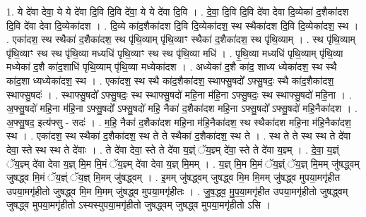 \documentclass[17pt]{extarticle}
\begin{document}
1. ये दे॑वा देवा॒ ये ये दे॑वा दि॒वि दि॒वि दे॑वा॒ ये ये दे॑वा दि॒वि । . दे॒वा॒ दि॒वि दि॒वि दे॑वा देवा दि॒व्येका॑ द॒शैका॑दश दि॒वि दे॑वा देवा दि॒व्येका॑दश । . दि॒व्ये का॑द॒शैका॑दश दि॒वि दि॒व्येका॑दश॒ स्थ स्थैका॑दश दि॒वि दि॒व्येका॑दश॒ स्थ । . एका॑दश॒ स्थ स्थैका॑ द॒शैका॑दश॒ स्थ पृ॑थि॒व्याम् पृ॑थि॒व्याꣳ स्थैका॑ द॒शैका॑दश॒ स्थ पृ॑थि॒व्याम् । . स्थ पृ॑थि॒व्याम् पृ॑थि॒व्याꣳ स्थ स्थ पृ॑थि॒व्या मध्यधि॑ पृथि॒व्याꣳ स्थ स्थ पृ॑थि॒व्या मधि॑ । . पृ॒थि॒व्या मध्यधि॑ पृथि॒व्याम् पृ॑थि॒व्या मध्येका॑ द॒शै का॑द॒शाधि॑ पृथि॒व्याम् पृ॑थि॒व्या मध्येका॑दश । . अध्येका॑ द॒शै का॑द॒ शाध्य ध्येका॑दश॒ स्थ स्थै का॑द॒शा ध्यध्येका॑दश॒ स्थ । . एका॑दश॒ स्थ स्थै का॑द॒शैका॑दश॒ स्थाफ्सु॒षदो᳚ ऽफ्सु॒षदः॒ स्थै का॑द॒शैका॑दश॒ स्थाफ्सु॒षदः॑ । . स्थाफ्सु॒षदो᳚ ऽफ्सु॒षदः॒ स्थ स्थाफ्सु॒षदो॑ महि॒ना म॑हि॒ना ऽफ्सु॒षदः॒ स्थ स्थाफ्सु॒षदो॑ महि॒ना । . अ॒फ्सु॒षदो॑ महि॒ना म॑हि॒ना ऽफ्सु॒षदो᳚ ऽफ्सु॒षदो॑ महि॒ नैका॑ द॒शैका॑दश महि॒ना ऽफ्सु॒षदो᳚ ऽफ्सु॒षदो॑ महि॒नैका॑दश । . अ॒फ्सु॒षद॒ इत्य॑फ्सु - सदः॑ । . म॒हि॒ नैका॑ द॒शैका॑दश महि॒ना म॑हि॒नैका॑दश॒ स्थ स्थैका॑दश महि॒ना म॑हि॒नैका॑दश॒ स्थ । . एका॑दश॒ स्थ स्थैका॑ द॒शैका॑दश॒ स्थ ते ते स्थैका॑ द॒शैका॑दश॒ स्थ ते । . स्थ ते ते स्थ स्थ ते दे॑वा देवा॒ स्ते स्थ स्थ ते दे॑वाः । . ते दे॑वा देवा॒ स्ते ते दे॑वा य॒ज्ञ्ं ॅय॒ज्ञ्म् दे॑वा॒ स्ते ते दे॑वा य॒ज्ञ्म् । . दे॒वा॒ य॒ज्ञ्ं ॅय॒ज्ञ्म् दे॑वा देवा य॒ज्ञ् मि॒म मि॒मं ॅय॒ज्ञ्म् दे॑वा देवा य॒ज्ञ् मि॒मम् । . य॒ज्ञ् मि॒म मि॒मं ॅय॒ज्ञ्ं ॅय॒ज्ञ् मि॒मम् जु॑षद्ध्वम् जुषद्ध्व मि॒मं ॅय॒ज्ञ्ं ॅय॒ज्ञ् मि॒मम् जु॑षद्ध्वम् । . इ॒मम् जु॑षद्ध्वम् जुषद्ध्व मि॒म मि॒मम् जु॑षद्ध्व मुपया॒मगृ॑हीत उपया॒मगृ॑हीतो जुषद्ध्व मि॒म मि॒मम् जु॑षद्ध्व मुपया॒मगृ॑हीतः । . जु॒ष॒द्ध्व॒ मु॒प॒या॒मगृ॑हीत उपया॒मगृ॑हीतो जुषद्ध्वम् जुषद्ध्व मुपया॒मगृ॑हीतो ऽस्यस्युपया॒मगृ॑हीतो जुषद्ध्वम् जुषद्ध्व मुपया॒मगृ॑हीतो ऽसि । \newline
\end{document}
